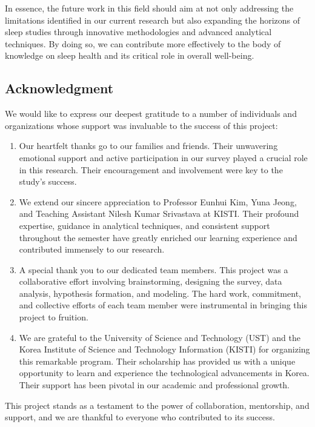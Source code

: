 \documentclass[conference]{IEEEtran}
\begin{document}
In essence, the future work in this field should aim at not only addressing the limitations identified in our current research but also expanding the horizons of sleep studies through innovative methodologies and advanced analytical techniques. By doing so, we can contribute more effectively to the body of knowledge on sleep health and its critical role in overall well-being.


\subsection*{Acknowledgment}

We would like to express our deepest gratitude to a number of individuals and organizations whose support was invaluable to the success of this project:

\begin{enumerate}
    \item Our heartfelt thanks go to our families and friends. Their unwavering emotional support and active participation in our survey played a crucial role in this research. Their encouragement and involvement were key to the study's success.

    \item We extend our sincere appreciation to Professor Eunhui Kim, Yuna Jeong, and Teaching Assistant Nilesh Kumar Srivastava at KISTI. Their profound expertise, guidance in analytical techniques, and consistent support throughout the semester have greatly enriched our learning experience and contributed immensely to our research.

    \item A special thank you to our dedicated team members. This project was a collaborative effort involving brainstorming, designing the survey, data analysis, hypothesis formation, and modeling. The hard work, commitment, and collective efforts of each team member were instrumental in bringing this project to fruition.

    \item We are grateful to the University of Science and Technology (UST) and the Korea Institute of Science and Technology Information (KISTI) for organizing this remarkable program. Their scholarship has provided us with a unique opportunity to learn and experience the technological advancements in Korea. Their support has been pivotal in our academic and professional growth.
\end{enumerate}

This project stands as a testament to the power of collaboration, mentorship, and support, and we are thankful to everyone who contributed to its success.



\end{document}
